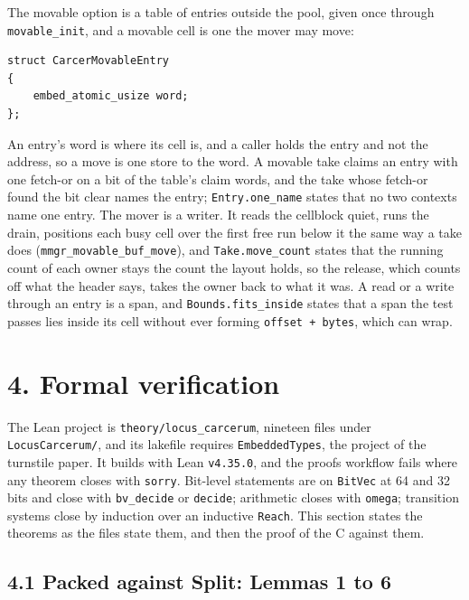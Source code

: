 The movable option is a table of entries outside the pool, given once through \texttt{movable\_\allowbreak{}init}, and a movable cell is one the mover may move:

\begin{Verbatim}
struct CarcerMovableEntry
{
    embed_atomic_usize word;
};
\end{Verbatim}

An entry's word is where its cell is, and a caller holds the entry and not the address, so a move is one store to the word. A movable take claims an entry with one fetch-or on a bit of the table's claim words, and the take whose fetch-or found the bit clear names the entry; \texttt{Entry.\allowbreak{}one\_\allowbreak{}name} states that no two contexts name one entry. The mover is a writer. It reads the cellblock quiet, runs the drain, positions each busy cell over the first free run below it the same way a take does (\texttt{mmgr\_\allowbreak{}movable\_\allowbreak{}buf\_\allowbreak{}move}), and \texttt{Take.\allowbreak{}move\_\allowbreak{}count} states that the running count of each owner stays the count the layout holds, so the release, which counts off what the header says, takes the owner back to what it was. A read or a write through an entry is a span, and \texttt{Bounds.\allowbreak{}fits\_\allowbreak{}inside} states that a span the test passes lies inside its cell without ever forming \texttt{offset + bytes}, which can wrap.

\section{\texorpdfstring{4. Formal verification}{4. Formal verification}}

The Lean project is \texttt{theory/\allowbreak{}locus\_\allowbreak{}carcerum}, nineteen files under \texttt{Locus\allowbreak{}Carcerum/\allowbreak{}}, and its lakefile requires \texttt{Embedded\allowbreak{}Types}, the project of the turnstile paper. It builds with Lean \texttt{v4.\allowbreak{}35.\allowbreak{}0}, and the proofs workflow fails where any theorem closes with \texttt{sorry}. Bit-level statements are on \texttt{Bit\allowbreak{}Vec} at 64 and 32 bits and close with \texttt{bv\_\allowbreak{}decide} or \texttt{decide}; arithmetic closes with \texttt{omega}; transition systems close by induction over an inductive \texttt{Reach}. This section states the theorems as the files state them, and then the proof of the C against them.

\subsection{\texorpdfstring{4.1 Packed against Split: Lemmas 1 to 6}{4.1 Packed against Split: Lemmas 1 to 6}}

